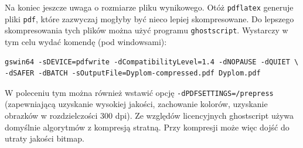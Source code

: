 Na koniec jeszcze uwaga o rozmiarze pliku wynikowego. Otóż \texttt{pdflatex} generuje pliki \texttt{pdf}, które zazwyczaj mogłyby być nieco lepiej
skompresowane. Do lepszego skompresowania tych plików można użyć programu \texttt{ghostscript}. Wystarczy w tym celu wydać komendę (pod windowsami):
\begin{lstlisting}[basicstyle=\footnotesize\ttfamily]
gswin64 -sDEVICE=pdfwrite -dCompatibilityLevel=1.4 -dNOPAUSE -dQUIET \
-dSAFER -dBATCH -sOutputFile=Dyplom-compressed.pdf Dyplom.pdf
\end{lstlisting}
W poleceniu tym można również wstawić opcję \texttt{-dPDFSETTINGS=/prepress} (zapewniającą uzyskanie wysokiej jakości, zachowanie kolorów, uzyskanie obrazków w rozdzielczości 300 dpi). Ze względów licencyjnych ghostscript używa domyślnie algorytmów z kompresją stratną. Przy kompresji może więc dojść do utraty jakości bitmap.

